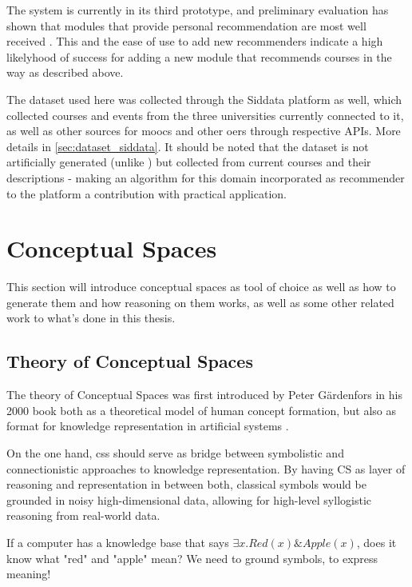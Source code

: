 The system is currently in its third prototype, and preliminary evaluation has shown that modules that provide personal recommendation are most well received \cite{Schurz2021}. This and the ease of use to add new recommenders indicate a high likelyhood of success for adding a new module that recommends courses in the way as described above.

The dataset used here was collected through the Siddata platform as well, which collected courses and events from the three universities currently connected to it, as well as other sources for \glspl{mooc} and other \glspl{oer} through respective APIs. More details in \autoref{sec:dataset_siddata}. It should be noted that the dataset is not artificially generated (unlike \mainalgos) but collected from current courses and their descriptions - making an algorithm for this domain incorporated as recommender to the platform a contribution with practical application.



\section{Conceptual Spaces}

This section will introduce conceptual spaces as tool of choice as well as how to generate them and how reasoning on them works, as well as some other related work to what's done in this thesis.

\subsection*{Theory of Conceptual Spaces}

The theory of Conceptual Spaces was first introduced by Peter Gärdenfors in his 2000 book  \cite{Gardenfors2000a} both as a theoretical model of human concept formation, but also as format for knowledge representation in artificial systems \cite{Gardenfors2004}. 

On the one hand, \glspl{cs} should serve as bridge between symbolistic and connectionistic approaches to knowledge representation. By having CS as layer of reasoning and representation in between both, classical symbols would be grounded in noisy high-dimensional data, allowing for high-level syllogistic reasoning from real-world data. 

If a computer has a knowledge base that says $\exists x.Red(x) \& Apple(x)$, does it know what "red" and "apple" mean? We need to ground symbols, to express meaning!

